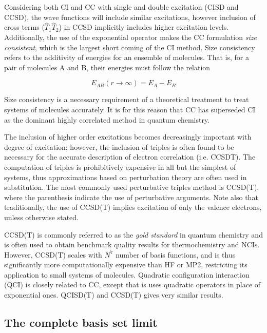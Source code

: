 \noindent Considering both CI and CC with single and double excitation (CISD and CCSD), the wave functions will include similar excitations, however inclusion of cross terms ($\hat{T}_1\hat{T}_2$) in CCSD implicitly includes higher excitation levels. Additionally, the use of the exponential operator makes the CC formulation \emph{size consistent}, which is the largest short coming of the CI method. Size consistency refers to the additivity of energies for an ensemble of molecules. That is, for a pair of molecules A and B, their energies must follow the relation

\begin{equation}
  E_{AB}(r\rightarrow\infty) = E_A + E_B
\end{equation}

\noindent Size consistency is a necessary requirement of a theoretical treatment to treat systems of molecules accurately. It is for this reason that CC has superseded CI as the dominant highly correlated method in quantum chemistry.

The inclusion of higher order excitations becomes decreasingly important with degree of excitation; however, the inclusion of triples is often found to be necessary for the accurate description of electron correlation (i.e. CCSDT). The computation of triples is prohibitively expensive in all but the simplest of systems, thus approximations based on perturbation theory are often used in substitution. The most commonly used perturbative triples method is CCSD(T), where the parenthesis indicate the use of perturbative arguments. Note also that traditionally, the use of CCSD(T) implies excitation of only the valence electrons, unless otherwise stated.

CCSD(T) is commonly referred to as the \emph{gold standard} in quantum chemistry and is often used to obtain benchmark quality results for thermochemistry and NCIs.\cite{Levine2013} However, CCSD(T) scales with $N^7$ number of basis functions, and is thus significantly more computationally expensive than HF or MP2, restricting its application to small systems of molecules. Quadratic configuration interaction (QCI) is closely related to CC, except that is uses quadratic operators in place of exponential ones. QCISD(T) and CCSD(T) gives very similar results.\cite{Pople1987}

\subsection{The complete basis set limit}

